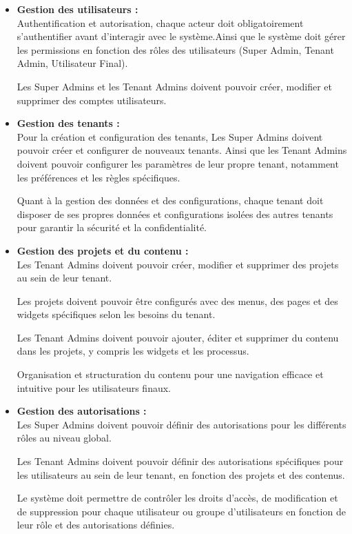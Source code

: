 \begin{itemize}
    \item \textbf{Gestion des utilisateurs :}\\
Authentification et autorisation, chaque acteur doit obligatoirement s'authentifier avant d'interagir avec le système.Ainsi que le système doit gérer les permissions en fonction des rôles des utilisateurs (Super Admin, Tenant Admin, Utilisateur Final).


Les Super Admins et les Tenant Admins doivent pouvoir créer, modifier et supprimer des comptes utilisateurs. 

    \item \textbf{Gestion des tenants :}\\
Pour la création et configuration des tenants, Les Super Admins doivent pouvoir créer et configurer de nouveaux tenants. Ainsi que les Tenant Admins doivent pouvoir configurer les paramètres de leur propre tenant, notamment les préférences et les règles spécifiques.

Quant à la gestion des données et des configurations, chaque tenant doit disposer de ses propres données et configurations isolées des autres tenants pour garantir la sécurité et la confidentialité.

    \item \textbf{Gestion des projets et du contenu :}\\
Les Tenant Admins doivent pouvoir créer, modifier et supprimer des projets au sein de leur tenant.

Les projets doivent pouvoir être configurés avec des menus, des pages et des widgets spécifiques selon les besoins du tenant.

Les Tenant Admins doivent pouvoir ajouter, éditer et supprimer du contenu dans les projets, y compris les widgets et les processus.

Organisation et structuration du contenu pour une navigation efficace et intuitive pour les utilisateurs finaux.

    \item \textbf{Gestion des autorisations :}\\
Les Super Admins doivent pouvoir définir des autorisations pour les différents rôles au niveau global.

Les Tenant Admins doivent pouvoir définir des autorisations spécifiques pour les utilisateurs au sein de leur tenant, en fonction des projets et des contenus.

Le système doit permettre de contrôler les droits d'accès, de modification et de suppression pour chaque utilisateur ou groupe d'utilisateurs en fonction de leur rôle et des autorisations définies.


\end{itemize}
